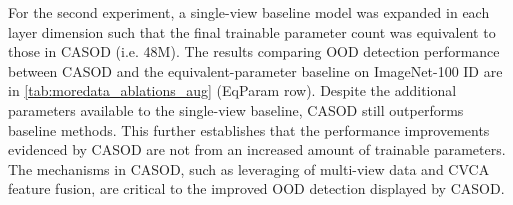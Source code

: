 %
%
For the second experiment, a single-view baseline model was expanded in each layer dimension such that the final trainable parameter count was equivalent to those in CASOD (i.e. 48M). The results comparing OOD detection performance between CASOD and the equivalent-parameter baseline on ImageNet-100 ID are in \ref{tab:moredata_ablations_aug} (EqParam row). Despite the additional parameters available to the single-view baseline, CASOD still outperforms baseline methods. This further establishes that the performance improvements evidenced by CASOD are not from an increased amount of trainable parameters. The mechanisms in CASOD, such as leveraging of multi-view data and CVCA feature fusion, are critical to the improved OOD detection displayed by CASOD.

